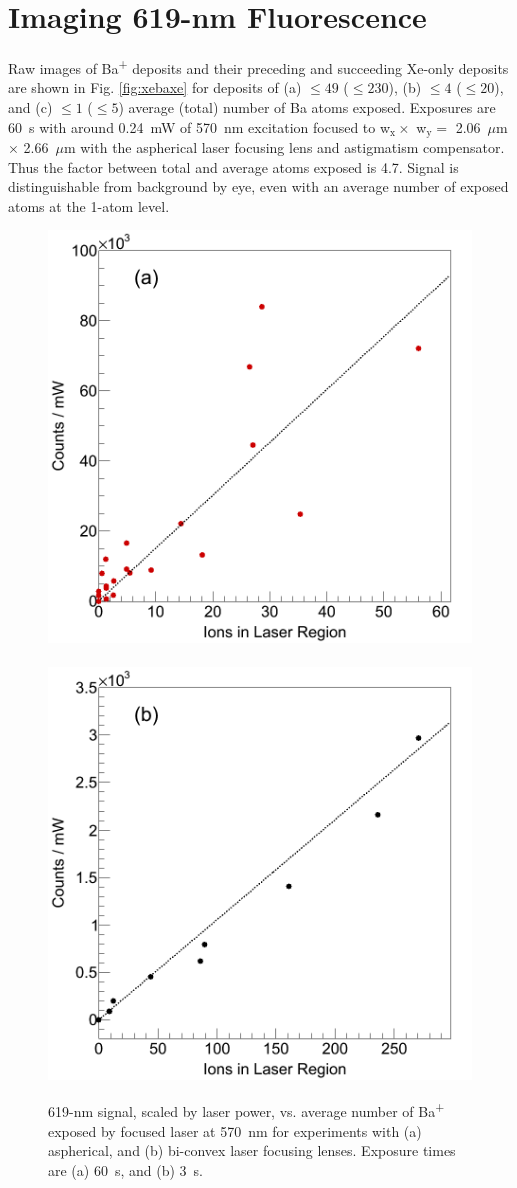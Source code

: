 \section{Imaging 619-nm Fluorescence}
\label{sec:imaging619}

Raw images of Ba\textsuperscript{+} deposits and their preceding and succeeding Xe-only deposits are shown in Fig. \ref{fig:xebaxe} for deposits of (a) $\leq 49$ ($\leq 230$), (b) $\leq 4$ ($\leq 20$), and (c) $\leq 1$ ($\leq 5$) average (total) number of Ba atoms exposed.  Exposures are 60~s with around 0.24~mW of 570~nm excitation focused to w$_{\text{x}} \times$ w$_{\text{y}} =$ 2.06~$\mu$m $\times$ 2.66~$\mu$m with the aspherical laser focusing lens and astigmatism compensator.  Thus the factor between total and average atoms exposed is 4.7.  Signal is distinguishable from background by eye, even with an average number of exposed atoms at the 1-atom level.


\begin{figure} %
        \centering
                \includegraphics[width=.5\textwidth]{figures/lin_just20150807_lin.png}
                ~
                \includegraphics[width=.5\textwidth]{figures/lin_just20150526_lin.png}
                \caption{619-nm signal, scaled by laser power, vs. average number of Ba\textsuperscript{+} exposed by focused laser at 570~nm for experiments with (a) aspherical, and (b) bi-convex laser focusing lenses.  Exposure times are (a) 60~s, and (b) 3~s.}
\label{fig:lin}
\end{figure}


